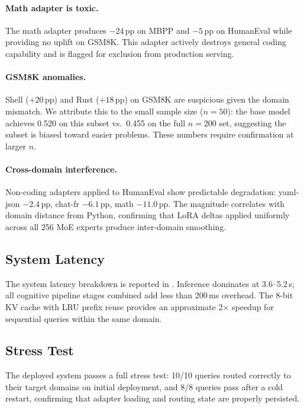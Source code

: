 \documentclass[11pt,a4paper]{article}
\begin{document}
\paragraph{Math adapter is toxic.}
The math adapter produces $-24$\,pp on MBPP and $-5$\,pp on HumanEval while providing no uplift on GSM8K. This adapter actively destroys general coding capability and is flagged for exclusion from production serving.

\paragraph{GSM8K anomalies.}
Shell ($+20$\,pp) and Rust ($+18$\,pp) on GSM8K are suspicious given the domain mismatch. We attribute this to the small sample size ($n{=}50$): the base model achieves 0.520 on this subset vs.\ 0.455 on the full $n{=}200$ set, suggesting the subset is biased toward easier problems. These numbers require confirmation at larger $n$.

\paragraph{Cross-domain interference.}
Non-coding adapters applied to HumanEval show predictable degradation: yaml-json $-2.4$\,pp, chat-fr $-6.1$\,pp, math $-11.0$\,pp. The magnitude correlates with domain distance from Python, confirming that LoRA deltas applied uniformly across all 256 MoE experts produce inter-domain smoothing.

\subsection{System Latency}

The system latency breakdown is reported in . Inference dominates at 3.6--5.2\,s; all cognitive pipeline stages combined add less than 200\,ms overhead. The 8-bit KV cache with LRU prefix reuse provides an approximate 2$\times$ speedup for sequential queries within the same domain.

\subsection{Stress Test}

The deployed system passes a full stress test: 10/10 queries routed correctly to their target domains on initial deployment, and 8/8 queries pass after a cold restart, confirming that adapter loading and routing state are properly persisted.
\end{document}
